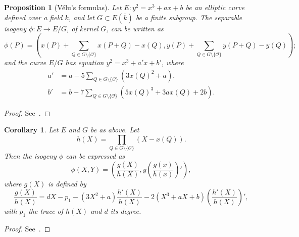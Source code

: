 \documentclass[10pt]{article}
\theoremstyle{plain}
\newtheorem{corollary}[theorem]{Corollary}
\newtheorem{proposition}[theorem]{Proposition}
\theoremstyle{definition}
\def\O{\ensuremath{\mathcal{O}}}
\begin{document}
\begin{proposition}[V\'elu's formulas]
  Let $E:y^2=x^3+ax+b$ be an elliptic curve defined over a field $k$,
  and let $G⊂E(\bar{k})$ be a finite subgroup. %
  The separable isogeny $ϕ:E\to E/G$, of kernel $G$, can be written as
  \begin{equation*}
    ϕ(P) = \left(
      x(P) + \sum_{Q∈G\setminus\{\O\}}x(P+Q)-x(Q),
      y(P) + \sum_{Q∈G\setminus\{\O\}}y(P+Q)-y(Q)
    \right);
  \end{equation*} %
  and the curve $E/G$ has equation $y^2=x^3+a'x+b'$, where
  \begin{align*}
    a' &= a - 5\sum_{Q∈G\setminus\{\O\}}(3x(Q)^2+a),\\
    b' &= b - 7\sum_{Q∈G\setminus\{\O\}}(5x(Q)^3+3ax(Q)+2b).
  \end{align*}
\end{proposition}
\begin{proof}
  See~\cite[\S8.2]{df+thesis}.
\end{proof}

\begin{corollary}
  Let $E$ and $G$ be as above. %
  Let
  \[h(X) = \prod_{Q∈G\setminus\{\O\}}(X-x(Q)).\]
  Then the isogeny $ϕ$ can be expressed as
  \[ϕ(X,Y) = \left(\frac{g(X)}{h(X)}, y\left(\frac{g(x)}{h(x)}\right)'\right),\]
  where $g(X)$ is defined by
  \[\frac{g(X)}{h(X)} = dX-p_1-(3X^2+a)\frac{h'(X)}{h(X)}
    - 2(X^3+aX+b)\left(\frac{h'(X)}{h(X)}\right)',\]
  with $p_1$ the trace of $h(X)$ and $d$ its degree.
\end{corollary}
\begin{proof}
  See~\cite[\S8.2]{df+thesis}.
\end{proof}
\end{document}
